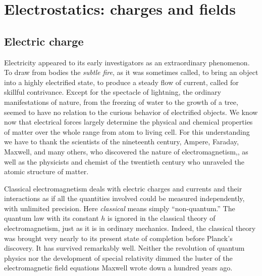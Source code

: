 \chapter{Electrostatics: charges and fields}

\section{Electric charge}

Electricity appeared to its early investigators as an extraordinary phenomenon.
To draw from bodies the \emph{subtle fire}, as it was
sometimes called, to bring an object into a highly electrified state, to
produce a steady flow of current, called for skillful contrivance. Except for
the spectacle of lightning, the ordinary manifestations of nature, from the
freezing of water to the growth of a tree, seemed to have no relation to the
curious behavior of electrified objects. We know now that electrical forces
largely determine the physical and chemical properties of matter over the whole
range from atom to living cell. For this understanding we have to thank the
scientists of the nineteenth century, Ampere, Faraday, Maxwell, and many
others, who discovered the nature of electromagnetism,, as well as the
physicists and chemist of the twentieth century who unraveled the atomic
structure of matter. 

Classical electromagnetism deals with electric charges and
currents and their interactions as if all the quantities involved could be
measured independently, with unlimited precision. Here \emph{classical} means
simply ``non-quantum.'' The quantum law with its constant $h$ is ignored in the
classical theory of electromagnetism, just as it is in ordinary mechanics. Indeed,
the classical theory was brought very nearly to its present state of completion
before Planck's discovery. It has survived remarkably well. Neither the
revolution of quantum physics nor the development of special relativity dimmed
the luster of the electromagnetic field equations Maxwell wrote down a hundred
years ago. 

